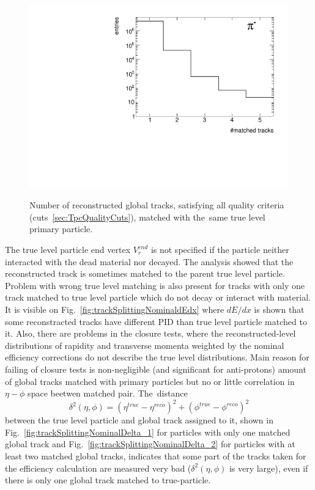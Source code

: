 \begin{figure}[ht]
{		\includegraphics[width=\linewidth,page=6]{graphics/eff/trackSplitting_CD.pdf}\\
	}%
	\caption[Number of reconstructed global tracks, satisfying all quality criteria, matched with the same true level primary particle.]{Number of reconstructed global tracks, satisfying all quality criteria (cuts~\ref{sec:TpcQualityCuts}), matched with the~same true level primary particle.}\label{fig:trackSplittingNominal}
\end{figure}

The true level particle end vertex $V_r^{end}$ is not specified if the particle neither interacted with the dead material nor decayed. The analysis showed that the reconstructed track is sometimes matched to the parent true level particle. Problem with wrong true level matching is also present for tracks with only one track matched to true level particle which do not decay or interact with material. 
It is visible on Fig.~\ref{fig:trackSplittingNominaldEdx} where $dE/dx$ is shown that some reconstracted tracks 
have different PID than true level particle matched to it.
 Also, there are problems in the closure tests, where  the  reconstructed-level distributions of rapidity and transverse momenta weighted by the nominal efficiency corrections do not describe the true level distributions. Main reason for failing of closure tests is non-negligible (and significant   for anti-protons) amount of global tracks matched with primary particles but no or little correlation in $\eta-\phi$ space beetwen
matched pair. 
The~distance 
\begin{equation}\label{eq:tpcMatchingDeltaSquare}
\delta^{2}\left(\eta,\phi\right)=\left(\eta^{true}-\eta^{reco}\right)^2+\left(\phi^{true}-\phi^{reco}\right)^2
\end{equation}
between the true level particle and global track assigned to it, shown in Fig.~\ref{fig:trackSplittingNominalDelta_1} for particles with only one  matched global track and Fig.~\ref{fig:trackSplittingNominalDelta_2} for particles with at least two  matched global tracks, indicates that some part of the tracks taken for the efficiency calculation are measured very bad ($\delta^{2}\left(\eta,\phi\right)$ is very large), even if there is only one global track matched to true-particle.

